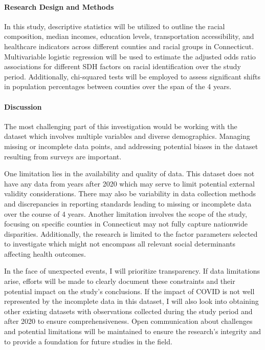 \documentclass[12pt]{article}
\begin{document}
\paragraph{Research Design and Methods}

In this study, descriptive statistics will be utilized to outline the racial composition, 
median incomes, education levels, transportation accessibility, and healthcare indicators 
across different counties and racial groups in Connecticut. Multivariable logistic regression 
will be used to estimate the adjusted odds ratio associations for different SDH factors on 
racial identification over the study period.\citep{Cova2023-yw} Additionally, chi-squared tests will be employed 
to assess significant shifts in population percentages between counties over the span of the 4 years.\citep{Lua2023-tp}


\paragraph{Discussion}
The most challenging part of this investigation would be working with the dataset which 
involves multiple variables and diverse demographics. Managing missing or incomplete data points,
and addressing potential biases in the dataset resulting from surveys are important. 

One limitation lies in the availability and quality of data. This dataset does not have any data 
from years after 2020 which may serve to limit potential external validity considerations. There may
also be variability in data collection methods and discrepancies in reporting standards leading to 
missing or incomplete data over the course of 4 years. Another limitation involves the scope of the 
study, focusing on specific counties in Connecticut may not fully capture nationwide disparities. 
Additionally, the research is limited to the factor parameters selected to investigate which  might 
not encompass all relevant social determinants affecting health outcomes.

In the face of unexpected events, I will prioritize transparency. If data limitations arise, efforts 
will be made to clearly document these constraints and their potential impact on the study's conclusions. 
If the impact of COVID is not well represented by the incomplete data in this dataset, I will also look 
into obtaining other existing datasets with observations collected during the study period and after 2020 
to ensure comprehensiveness. Open communication about challenges and potential limitations will be 
maintained to ensure the research's integrity and to provide a foundation for future studies in the field.
\end{document}
